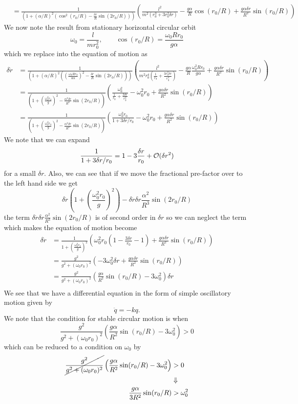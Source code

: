 \documentclass[11pt]{article}
\numberwithin{equation}{section}
\begin{document}
\begin{enumerate}[(a)]
\begin{align*}
&= \frac{1}{\left(1 + \left(\alpha/R\right)^2\left(\cos^2(r_0/R)-\frac{\delta{r}}{R}\sin(2r_0/R)\right)\right)}\left(\frac{l^2}{m^2(r_0^3+3r_0^2\delta{r})} - \frac{g\alpha}{R}\cos(r_0/R) + \frac{g\alpha\delta{r}}{R^2}\sin(r_0/R)\right)
\end{align*}
We now note the result from stationary horizontal circular orbit 
$$\omega_0 = \frac{l}{mr_0^2},\qquad \cos(r_0/R)=\frac{\omega_0Rr_0}{g\alpha}$$
which we replace into the equation of motion as
\begin{align*}
\delta\ddot{r} &= \frac{1}{\left(1 + \left(\alpha/R\right)^2\left(\left(\frac{\omega_0Rr_0}{a\alpha}\right)^2-\frac{\delta{r}}{R}\sin(2r_0/R)\right)\right)}\left(\frac{l^2}{m^2r_0^4(\frac{1}{r_0}+\frac{3r_0^2\delta{r}}{r_0^4})} - \frac{g\alpha}{R}\frac{\omega_0^2Rr_0}{g\alpha} + \frac{g\alpha\delta{r}}{R^2}\sin(r_0/R)\right)\\
&= \frac{1}{\left(1 + \left(\frac{\omega_0^2r_0}{g}\right)^2-\frac{\alpha^2\delta{r}}{R^3}\sin(2r_0/R)\right)}\left(\frac{\omega_0^2}{\frac{1}{r_0}+\frac{3\delta{r}}{r_0^2}} - \omega_0^2r_0 + \frac{g\alpha\delta{r}}{R^2}\sin(r_0/R)\right)\\
&= \frac{1}{\left(1 + \left(\frac{\omega_0^2r_0}{g}\right)^2-\frac{\alpha^2\delta{r}}{R^3}\sin(2r_0/R)\right)}\left(\frac{\omega_0^2r_0}{1+3\delta{r}/r_0} - \omega_0^2r_0 + \frac{g\alpha\delta{r}}{R^2}\sin(r_0/R)\right)
\end{align*}
We note that we can expand 
$$\frac{1}{1+3\delta{r}/r_0} = 1 - 3\frac{\delta{r}}{r_0} + \mathcal{O}(\delta{r}^2)$$
for a small $\delta{r}$. Also, we can see that if we move the fractional pre-factor over to
the left hand side we get 
$$\delta\ddot{r}\left(1+ \left(\frac{\omega_0^2r_0}{g}\right)^2\right)-\delta\ddot{r}\delta{r}\frac{\alpha^2}{R^3}\sin(2r_0/R)$$
the term $\delta\ddot{r}\delta{r}\frac{\alpha^2}{R^3}\sin(2r_0/R)$ is of second order in 
$\delta{r}$ so we can neglect the term which makes the equation of motion become
\begin{align*}
\delta\ddot{r} &= \frac{1}{1 + \left(\frac{\omega_0^2r_0}{g}\right)^2}\left(\omega_0^2r_0\left(1-\frac{3\delta{r}}{r_0} - 1\right) + \frac{g\alpha\delta{r}}{R^2}\sin(r_0/R)\right)\\
&= \frac{g^2}{g^2 + (\omega_0r_0)^2}\left(-3\omega_0^2\delta{r} + \frac{g\alpha\delta{r}}{R^2}\sin(r_0/R)\right)\\
&= \frac{g^2}{g^2 + (\omega_0r_0)^2}\left(\frac{g\alpha}{R^2}\sin(r_0/R)-3\omega_0^2\right)\delta{r}\\
\end{align*}
We see that we have a differential equation in the form of simple oscillatory motion given 
by
$$\ddot{q} = -kq.$$
We note that the condition for stable circular motion is when
$$\frac{g^2}{g^2 + (\omega_0r_0)^2}\left(\frac{g\alpha}{R^2}\sin(r_0/R)-3\omega_0^2\right)>0$$
which can be reduced to a condition on $\omega_0$ by
\begin{align*}
\cancel{\frac{g^2}{g^2 + (\omega_0r_0)^2}}\left(\frac{g\alpha}{R^2}\sin(r_0/R)-3\omega_0^2\right) &> 0\\
&\Downarrow\\
\frac{g\alpha}{3R^2}\sin(r_0/R) &> \omega_0^2
\end{align*}


\end{enumerate}
\end{document}
